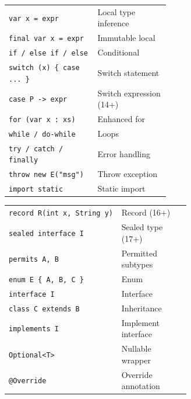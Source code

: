 \documentclass[10pt]{extarticle}
\begin{document}
\begin{multicols}{2}

\begin{tabularx}{\linewidth}{@{}>{\raggedright\arraybackslash}p{0.55\linewidth}@{\enspace}Y@{}}
\texttt{var x = expr}                & Local type inference \\
\texttt{final var x = expr}          & Immutable local \\
\texttt{if / else if / else}         & Conditional \\
\texttt{switch (x) \{ case ... \}}   & Switch statement \\
\texttt{case P -> expr}              & Switch expression (14+) \\
\texttt{for (var x : xs)}            & Enhanced for \\
\texttt{while / do-while}            & Loops \\
\texttt{try / catch / finally}       & Error handling \\
\texttt{throw new E("msg")}          & Throw exception \\
\texttt{import static}               & Static import \\
\end{tabularx}

\begin{tabularx}{\linewidth}{@{}>{\raggedright\arraybackslash}p{0.62\linewidth}@{\enspace}Y@{}}
\texttt{record R(int x, String y)}   & Record (16+) \\
\texttt{sealed interface I}          & Sealed type (17+) \\
\texttt{permits A, B}               & Permitted subtypes \\
\texttt{enum E \{ A, B, C \}}       & Enum \\
\texttt{interface I}                 & Interface \\
\texttt{class C extends B}           & Inheritance \\
\texttt{implements I}                & Implement interface \\
\texttt{Optional<T>}                & Nullable wrapper \\
\texttt{@Override}                   & Override annotation \\
\end{tabularx}


\end{multicols}
\end{document}
